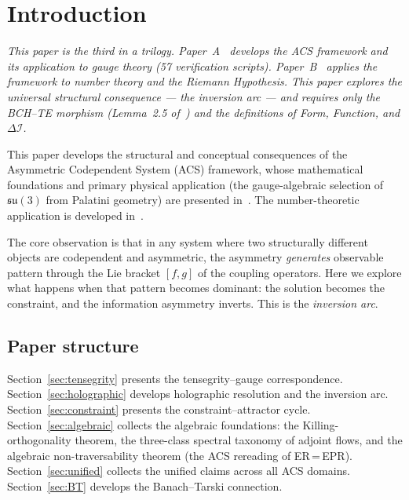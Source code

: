 \documentclass[11pt,a4paper]{article}
\theoremstyle{plain}
\theoremstyle{definition}
\theoremstyle{remark}
\newcommand{\DI}{\Delta\mathcal{I}}
\begin{document}
\clearpage
{}
\setcounter{page}{1}
\tableofcontents
\clearpage
{}
\setcounter{page}{1}

\section{Introduction}
\label{sec:intro}

\noindent\textit{This paper is the third in a trilogy.
Paper~A~\cite{Wallace2026a} develops the ACS framework and its
application to gauge theory (57 verification scripts).
Paper~B~\cite{Wallace2026b} applies the framework to number theory
and the Riemann Hypothesis.  This paper explores the universal
structural consequence --- the inversion arc --- and requires only
the BCH--TE morphism (Lemma~2.5 of~\cite{Wallace2026a}) and the
definitions of Form, Function, and $\DI$.}

\medskip\noindent
This paper develops the structural and conceptual consequences of the
Asymmetric Codependent System (ACS) framework, whose mathematical
foundations and primary physical application (the gauge-algebraic
selection of $\mathfrak{su}(3)$ from Palatini geometry) are presented
in~\cite{Wallace2026a}.  The number-theoretic application is developed
in~\cite{Wallace2026b}.

The core observation is that in any system where two structurally
different objects are codependent and asymmetric, the asymmetry
\emph{generates} observable pattern through the Lie bracket $[f,g]$
of the coupling operators.  Here we explore what happens when that
pattern becomes dominant: the solution becomes the constraint, and the
information asymmetry inverts.  This is the \emph{inversion arc}.

\subsection{Paper structure}
Section~\ref{sec:tensegrity} presents the tensegrity--gauge correspondence.
Section~\ref{sec:holographic} develops holographic resolution and the inversion arc.
Section~\ref{sec:constraint} presents the constraint--attractor cycle.
Section~\ref{sec:algebraic} collects the algebraic foundations: the
Killing-orthogonality theorem, the three-class spectral taxonomy of
adjoint flows, and the algebraic non-traversability theorem (the
ACS rereading of ER\,=\,EPR).
Section~\ref{sec:unified} collects the unified claims across all ACS domains.
Section~\ref{sec:BT} develops the Banach--Tarski connection.
\end{document}
